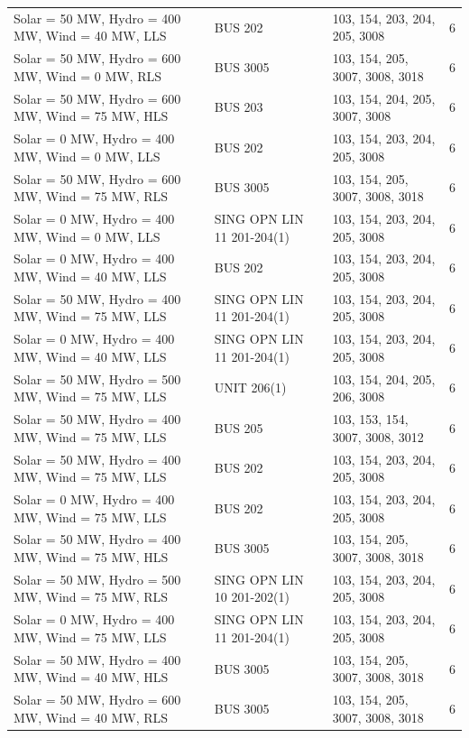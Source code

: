 \documentclass[10pt]{report}
\begin{document}
\begin{table}[H]
{\begin{tabular}{llp{8cm}r}
Solar = 50 MW, Hydro = 400 MW, Wind = 40 MW, LLS & BUS 202 & 103, 154, 203, 204, 205, 3008 & 6 \\
Solar = 50 MW, Hydro = 600 MW, Wind = 0 MW, RLS & BUS 3005 & 103, 154, 205, 3007, 3008, 3018 & 6 \\
Solar = 50 MW, Hydro = 600 MW, Wind = 75 MW, HLS & BUS 203 & 103, 154, 204, 205, 3007, 3008 & 6 \\
Solar = 0 MW, Hydro = 400 MW, Wind = 0 MW, LLS & BUS 202 & 103, 154, 203, 204, 205, 3008 & 6 \\
Solar = 50 MW, Hydro = 600 MW, Wind = 75 MW, RLS & BUS 3005 & 103, 154, 205, 3007, 3008, 3018 & 6 \\
Solar = 0 MW, Hydro = 400 MW, Wind = 0 MW, LLS & SING OPN LIN   11 201-204(1) & 103, 154, 203, 204, 205, 3008 & 6 \\
Solar = 0 MW, Hydro = 400 MW, Wind = 40 MW, LLS & BUS 202 & 103, 154, 203, 204, 205, 3008 & 6 \\
Solar = 50 MW, Hydro = 400 MW, Wind = 75 MW, LLS & SING OPN LIN   11 201-204(1) & 103, 154, 203, 204, 205, 3008 & 6 \\
Solar = 0 MW, Hydro = 400 MW, Wind = 40 MW, LLS & SING OPN LIN   11 201-204(1) & 103, 154, 203, 204, 205, 3008 & 6 \\
Solar = 50 MW, Hydro = 500 MW, Wind = 75 MW, LLS & UNIT 206(1) & 103, 154, 204, 205, 206, 3008 & 6 \\
Solar = 50 MW, Hydro = 400 MW, Wind = 75 MW, LLS & BUS 205 & 103, 153, 154, 3007, 3008, 3012 & 6 \\
Solar = 50 MW, Hydro = 400 MW, Wind = 75 MW, LLS & BUS 202 & 103, 154, 203, 204, 205, 3008 & 6 \\
Solar = 0 MW, Hydro = 400 MW, Wind = 75 MW, LLS & BUS 202 & 103, 154, 203, 204, 205, 3008 & 6 \\
Solar = 50 MW, Hydro = 400 MW, Wind = 75 MW, HLS & BUS 3005 & 103, 154, 205, 3007, 3008, 3018 & 6 \\
Solar = 50 MW, Hydro = 500 MW, Wind = 75 MW, RLS & SING OPN LIN   10 201-202(1) & 103, 154, 203, 204, 205, 3008 & 6 \\
Solar = 0 MW, Hydro = 400 MW, Wind = 75 MW, LLS & SING OPN LIN   11 201-204(1) & 103, 154, 203, 204, 205, 3008 & 6 \\
Solar = 50 MW, Hydro = 400 MW, Wind = 40 MW, HLS & BUS 3005 & 103, 154, 205, 3007, 3008, 3018 & 6 \\
Solar = 50 MW, Hydro = 600 MW, Wind = 40 MW, RLS & BUS 3005 & 103, 154, 205, 3007, 3008, 3018 & 6 \\

\end{tabular}}
\end{table}
\end{document}
